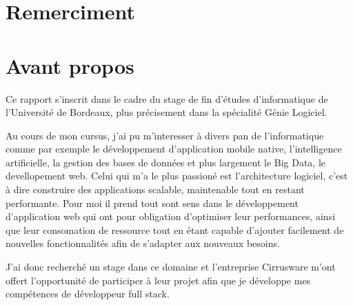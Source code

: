 \section{Remerciment}

\newpage
\section{Avant propos}
Ce rapport s'inscrit dans le cadre du stage de fin d'études d'informatique de l'Université de Bordeaux, plus précisement dans la spécialité Génie Logiciel.

Au cours de mon cursus, j'ai pu m'interesser à divers pan de l'informatique comme par exemple le développement d'application mobile native, l'intelligence artificielle, la gestion des bases de données et plus largement le Big Data, le devellopement web. Celui qui m'a le plus passioné est l'architecture logiciel, c'est à dire construire des applications scalable, maintenable tout en restant performante. Pour moi il prend tout sont sens dans le développement d'application web qui ont pour obligation d'optimiser leur performances, ainsi que leur consomation de ressource tout en étant capable d'ajouter facilement de nouvelles fonctionnalités afin de s'adapter aux nouveaux besoins.

J'ai donc recherché un stage dans ce domaine et l'entreprise Cirrusware m'ont offert l'opportunité de participer à leur projet afin que je développe mes compétences de développeur full stack. 




